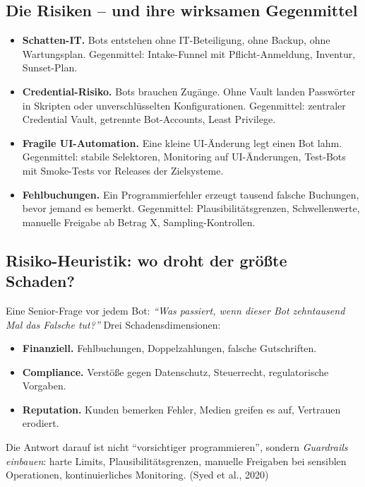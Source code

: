 \documentclass[11pt,a4paper,oneside]{article}
\newcommand{\fachbegriff}[1]{\textbf{#1}}
\newcommand{\quelle}[1]{{\footnotesize\color{lpGray}(#1)}}
\begin{document}
\subsection{Die Risiken -- und ihre wirksamen Gegenmittel}

\begin{itemize}
  \item \fachbegriff{Schatten-IT.} Bots entstehen ohne IT-Beteiligung, ohne Backup, ohne Wartungsplan. Gegenmittel: Intake-Funnel mit Pflicht-Anmeldung, Inventur, Sunset-Plan.
  \item \fachbegriff{Credential-Risiko.} Bots brauchen Zugänge. Ohne Vault landen Passwörter in Skripten oder unverschlüsselten Konfigurationen. Gegenmittel: zentraler Credential Vault, getrennte Bot-Accounts, Least Privilege.
  \item \fachbegriff{Fragile UI-Automation.} Eine kleine UI-Änderung legt einen Bot lahm. Gegenmittel: stabile Selektoren, Monitoring auf UI-Änderungen, Test-Bots mit Smoke-Tests vor Releases der Zielsysteme.
  \item \fachbegriff{Fehlbuchungen.} Ein Programmierfehler erzeugt tausend falsche Buchungen, bevor jemand es bemerkt. Gegenmittel: Plausibilitätsgrenzen, Schwellenwerte, manuelle Freigabe ab Betrag X, Sampling-Kontrollen.
\end{itemize}

\subsection{Risiko-Heuristik: wo droht der größte Schaden?}

Eine Senior-Frage vor jedem Bot: \emph{``Was passiert, wenn dieser Bot zehntausend Mal das Falsche tut?''} Drei Schadensdimensionen:

\begin{itemize}
  \item \textbf{Finanziell.} Fehlbuchungen, Doppelzahlungen, falsche Gutschriften.
  \item \textbf{Compliance.} Verstöße gegen Datenschutz, Steuerrecht, regulatorische Vorgaben.
  \item \textbf{Reputation.} Kunden bemerken Fehler, Medien greifen es auf, Vertrauen erodiert.
\end{itemize}

Die Antwort darauf ist nicht ``vorsichtiger programmieren'', sondern \emph{Guardrails einbauen}: harte Limits, Plausibilitätsgrenzen, manuelle Freigaben bei sensiblen Operationen, kontinuierliches Monitoring. \quelle{Syed et al., 2020}
\end{document}

